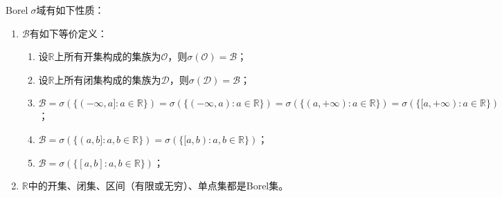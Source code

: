 \begin{property}\label{prop:BorelSigmaField}
	Borel$\;\sigma$域有如下性质：	
	\begin{enumerate}
		\item $\mathcal{B}$有如下等价定义：
		\begin{enumerate}
			\item 设$\mathbb{R}$上所有开集构成的集族为$\mathcal{O}$，则$\sigma(\mathcal{O})=\mathcal{B}$；
			\item 
			设$\mathbb{R}$上所有闭集构成的集族为$\mathcal{D}$，则$\sigma(\mathcal{D})=\mathcal{B}$；
			\item $\mathcal{B}=\sigma(\{(-\infty,a]:a\in\mathbb{R}\})=\sigma(\{(-\infty,a):a\in\mathbb{R}\})=\sigma(\{(a,+\infty):a\in\mathbb{R}\})=\sigma(\{[a,+\infty):a\in\mathbb{R}\})$；
			\item $\mathcal{B}=\sigma(\{(a,b]:a,b\in\mathbb{R}\})=\sigma(\{[a,b):a,b\in\mathbb{R}\})$；
			\item $\mathcal{B}=\sigma(\{[a,b]:a,b\in\mathbb{R}\})$；
		\end{enumerate}
		\item $\mathbb{R}$中的开集、闭集、区间（有限或无穷）、单点集都是Borel集。
	\end{enumerate}
\end{property}

